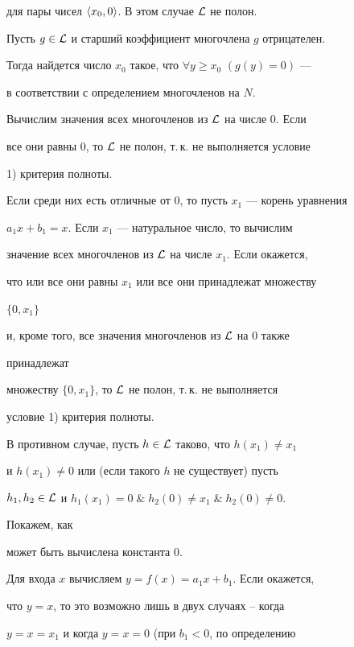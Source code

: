 \begin{pf}
для пары чисел $\langle x_0,0\rangle$. В этом случае $\cal L$ не полон. 


 


Пусть $g\in\cal L$ и старший коэффициент многочлена $g$ отрицателен. 


Тогда найдется число $x_0$ такое, что $\forall y\ge x_0$ $(g(y)=0)$ --- 


в соответствии с определением многочленов на $N$. 


 


Вычислим значения всех многочленов из $\cal L$ на числе 0. Если 


все они равны 0, то $\cal L$ не полон, т.\,к. не выполняется условие 


1) критерия полноты. 


 


Если среди них есть отличные от 0, то пусть $x_1$ --- корень уравнения 


$a_1x+b_1=x$. Если $x_1$ --- натуральное число, то вычислим 


значение всех многочленов из $\cal L$ на числе $x_1$. Если окажется, 


что или все они равны $x_1$ или все они принадлежат множеству 


$\{0,x_1\}$ 


и, кроме того, все значения многочленов из $\cal L$ на 0 также 


принадлежат 


множеству $\{0,x_1\}$, то $\cal L$ не полон, т.\,к. не выполняется 


условие 1) критерия полноты. 


 


В противном случае, пусть $h\in\cal L$ таково, что $h(x_1)\ne x_1$ 


и $h(x_1)\ne 0$ или (если такого $h$ не существует) пусть 


$h_1,h_2\in\cal L$ и $h_1(x_1)=0\;\&\;h_2(0)\ne x_1\;\&\;h_2(0)\ne 0$. 


Покажем, как 


может быть вычислена константа 0. 


Для входа $x$ вычисляем $y=f(x)=a_1x+b_1$. Если окажется, 


что $y=x$, то это возможно лишь в двух случаях -- когда 


$y=x=x_1$ и когда $y=x=0$ (при $b_1<0$, по определению 



\end{pf}

